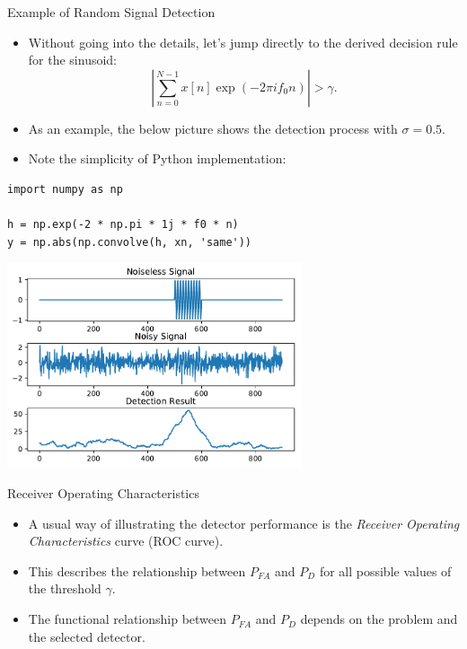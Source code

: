 \documentclass[10pt, aspectratio=169]{beamer} %
\begin{document}
\begin{frame}[allowframebreaks=0.8,fragile]
 {Example of Random Signal Detection}
\begin{itemize}
\item Without going into the details, let's jump directly to the derived decision
rule for the sinusoid:
\[
\left|\sum_{n=0}^{N-1} x[n]\exp(-2\pi i f_0 n) \right| > \gamma.
\]
\item As an example, the below picture shows the detection process with $\sigma = 0.5$.

\item Note the simplicity of Python implementation:
\end{itemize}
\begin{center}
\begin{minipage}{5cm}
\begin{lstlisting}
import numpy as np

h = np.exp(-2 * np.pi * 1j * f0 * n)
y = np.abs(np.convolve(h, xn, 'same'))
\end{lstlisting}
\end{minipage}
\end{center}
\centerline{\includegraphics[width=0.65\textwidth]{rayleighSinusoid.pdf}}
\end{frame}



\begin{frame}[fragile,allowframebreaks=0.8]
 {Receiver Operating Characteristics}

\begin{itemize}
\item A usual way of illustrating the detector performance is the
\emph{Receiver Operating Characteristics} curve (ROC curve).
\item This describes the relationship between $P_{FA}$ and $P_D$
for all possible values of the threshold $\gamma$.
\item The functional relationship between $P_{FA}$ and $P_D$
depends on the problem and the selected detector.
\end{itemize}
\end{frame}
\end{document}

